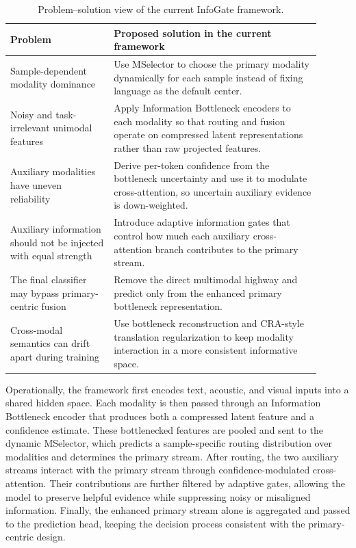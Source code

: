 \documentclass[11pt]{article}
\begin{document}
\begin{table}[h]
\centering
\begin{tabular}{>{\raggedright\arraybackslash}p{0.30\linewidth} >{\raggedright\arraybackslash}p{0.60\linewidth}}
\toprule
Problem & Proposed solution in the current framework \\
\midrule
Sample-dependent modality dominance & Use MSelector to choose the primary modality dynamically for each sample instead of fixing language as the default center. \\
Noisy and task-irrelevant unimodal features & Apply Information Bottleneck encoders to each modality so that routing and fusion operate on compressed latent representations rather than raw projected features. \\
Auxiliary modalities have uneven reliability & Derive per-token confidence from the bottleneck uncertainty and use it to modulate cross-attention, so uncertain auxiliary evidence is down-weighted. \\
Auxiliary information should not be injected with equal strength & Introduce adaptive information gates that control how much each auxiliary cross-attention branch contributes to the primary stream. \\
The final classifier may bypass primary-centric fusion & Remove the direct multimodal highway and predict only from the enhanced primary bottleneck representation. \\
Cross-modal semantics can drift apart during training & Use bottleneck reconstruction and CRA-style translation regularization to keep modality interaction in a more consistent informative space. \\
\bottomrule
\end{tabular}
\caption{Problem--solution view of the current InfoGate framework.}
\end{table}

Operationally, the framework first encodes text, acoustic, and visual inputs into
a shared hidden space. Each modality is then passed through an Information
Bottleneck encoder that produces both a compressed latent feature and a
confidence estimate. These bottlenecked features are pooled and sent to the
dynamic MSelector, which predicts a sample-specific routing distribution over
modalities and determines the primary stream. After routing, the two auxiliary
streams interact with the primary stream through confidence-modulated
cross-attention. Their contributions are further filtered by adaptive gates,
allowing the model to preserve helpful evidence while suppressing noisy or
misaligned information. Finally, the enhanced primary stream alone is aggregated
and passed to the prediction head, keeping the decision process consistent with
the primary-centric design.
\end{document}
